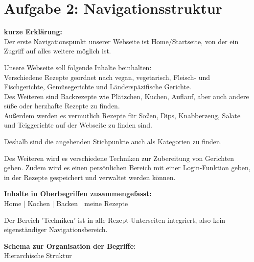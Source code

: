 \documentclass[parskip,10pt,abstracton]{scrartcl}
\begin{document}
\section*{Aufgabe 2: Navigationsstruktur}


\textbf{kurze Erklärung:}\\
Der erste Navigationspunkt unserer Webseite ist Home/Startseite, von der ein Zugriff auf alles weitere möglich ist.

Unsere Webseite soll folgende Inhalte beinhalten:\\
Verschiedene Rezepte geordnet nach vegan, vegetarisch, Fleisch- und Fischgerichte, Gemüsegerichte und Länderspäzifische Gerichte. \\
Des Weiteren sind Backrezepte wie Plätzchen, Kuchen, Auflauf, aber auch andere süße oder herzhafte Rezepte zu finden. \\
Außerdem werden es vermutlich Rezepte für Soßen, Dips, Knabberzeug, Salate und Teiggerichte auf der Webseite zu finden sind. 

Deshalb sind die angehenden Stichpunkte auch als Kategorien zu finden. 

Des Weiteren wird es verschiedene Techniken zur Zubereitung von Gerichten geben. 
Zudem wird es einen persönlichen Bereich mit einer Login-Funktion geben, in der Rezepte gespeichert und verwaltet werden können.



\textbf{Inhalte in Oberbegriffen zusammengefasst:} \\
Home | Kochen | Backen | meine Rezepte

Der Bereich 'Techniken' ist in alle Rezept-Unterseiten integriert, also kein eigenständiger Navigationsbereich.

\pagebreak
\textbf{Schema zur Organisation der Begriffe:}\\
Hierarchische Struktur

\end{document}
